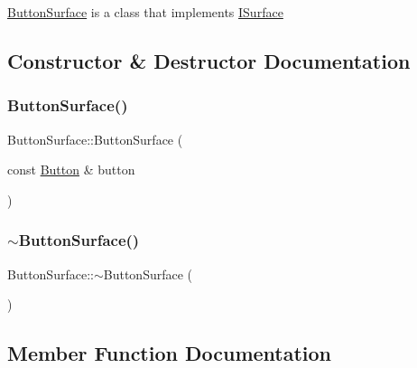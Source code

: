 \mbox{\hyperlink{class_button_surface}{Button\+Surface}} is a class that implements \mbox{\hyperlink{class_i_surface}{I\+Surface}} 

\subsection{Constructor \& Destructor Documentation}
\mbox{\label{class_button_surface_a47947226032ffc3af61d8e46060fdb0f}} 
\subsubsection{\texorpdfstring{Button\+Surface()}{ButtonSurface()}}
{\footnotesize\ttfamily Button\+Surface\+::\+Button\+Surface (\begin{DoxyParamCaption}\item[{const \mbox{\hyperlink{class_button}{Button}} \&}]{button }\end{DoxyParamCaption})}

\mbox{\label{class_button_surface_aabb7a64d5690fe392b8e3ca645640701}} 
\subsubsection{\texorpdfstring{$\sim$\+Button\+Surface()}{~ButtonSurface()}}
{\footnotesize\ttfamily Button\+Surface\+::$\sim$\+Button\+Surface (\begin{DoxyParamCaption}{ }\end{DoxyParamCaption})\hspace{0.3cm}{\ttfamily [virtual]}}



\subsection{Member Function Documentation}
\mbox{\label{class_button_surface_a296e13e3b1e7b0d52cfb67f6627d6f91}} 
